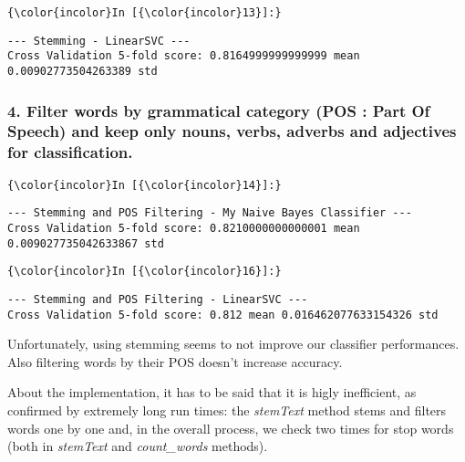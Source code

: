 \documentclass[11pt]{article}
\begin{document}
    \begin{Verbatim}[commandchars=\\\{\}]
{\color{incolor}In [{\color{incolor}13}]:} 
\end{Verbatim}


    \begin{Verbatim}[commandchars=\\\{\}]
--- Stemming - LinearSVC ---
Cross Validation 5-fold score: 0.8164999999999999 mean 0.00902773504263389 std 

    \end{Verbatim}

    \subsubsection{4. Filter words by grammatical category (POS : Part Of
Speech) and keep only nouns, verbs, adverbs and adjectives for
classification.}\label{filter-words-by-grammatical-category-pos-part-of-speech-and-keep-only-nouns-verbs-adverbs-and-adjectives-for-classification.}

    \begin{Verbatim}[commandchars=\\\{\}]
{\color{incolor}In [{\color{incolor}14}]:} 
\end{Verbatim}


    \begin{Verbatim}[commandchars=\\\{\}]
--- Stemming and POS Filtering - My Naive Bayes Classifier ---
Cross Validation 5-fold score: 0.8210000000000001 mean 0.009027735042633867 std 

    \end{Verbatim}

    \begin{Verbatim}[commandchars=\\\{\}]
{\color{incolor}In [{\color{incolor}16}]:} 
\end{Verbatim}


    \begin{Verbatim}[commandchars=\\\{\}]
--- Stemming and POS Filtering - LinearSVC ---
Cross Validation 5-fold score: 0.812 mean 0.016462077633154326 std 

    \end{Verbatim}

    Unfortunately, using stemming seems to not improve our classifier
performances. Also filtering words by their POS doesn't increase
accuracy.

About the implementation, it has to be said that it is higly
inefficient, as confirmed by extremely long run times: the
\emph{stemText} method stems and filters words one by one and, in the
overall process, we check two times for stop words (both in
\emph{stemText} and \emph{count\_words} methods).


    
    
    
    
\end{document}
